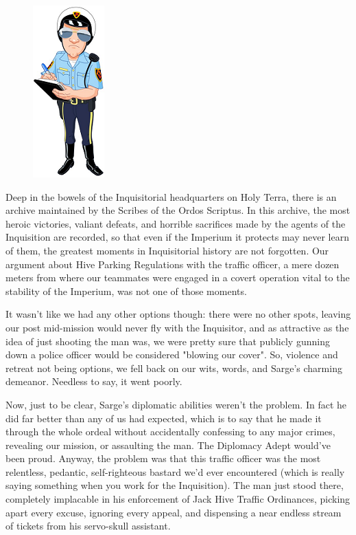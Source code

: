 

\begin{figure}
	\begin{center}
		\includegraphics[width=\figwidth]{pics/17/38.png}
	\end{center}
\end{figure}
Deep in the bowels of the Inquisitorial headquarters on Holy Terra, there is an archive maintained by the Scribes of the Ordos Scriptus. 
In this archive, the most heroic victories, valiant defeats, and horrible sacrifices made by the agents of the Inquisition are recorded, so that even if the Imperium it protects may never learn of them, the greatest moments in Inquisitorial history are not forgotten. 
Our argument about Hive Parking Regulations with the traffic officer, a mere dozen meters from where our teammates were engaged in a covert operation vital to the stability of the Imperium, was not one of those moments.

It wasn't like we had any other options though: 
there were no other spots, leaving our post mid-mission would never fly with the Inquisitor, and as attractive as the idea of just shooting the man was, we were pretty sure that publicly gunning down a police officer would be considered "blowing our cover". 
So, violence and retreat not being options, we fell back on our wits, words, and Sarge's charming demeanor. 
Needless to say, it went poorly.

Now, just to be clear, Sarge's diplomatic abilities weren't the problem. 
In fact he did far better than any of us had expected, which is to say that he made it through the whole ordeal without accidentally confessing to any major crimes, revealing our mission, or assaulting the man. 
The Diplomacy Adept would've been proud. 
Anyway, the problem was that this traffic officer was the most relentless, pedantic, self-righteous bastard we'd ever encountered (which is really saying something when you work for the Inquisition). 
The man just stood there, completely implacable in his enforcement of Jack Hive Traffic Ordinances, picking apart every excuse, ignoring every appeal, and dispensing a near endless stream of tickets from his servo-skull assistant.

